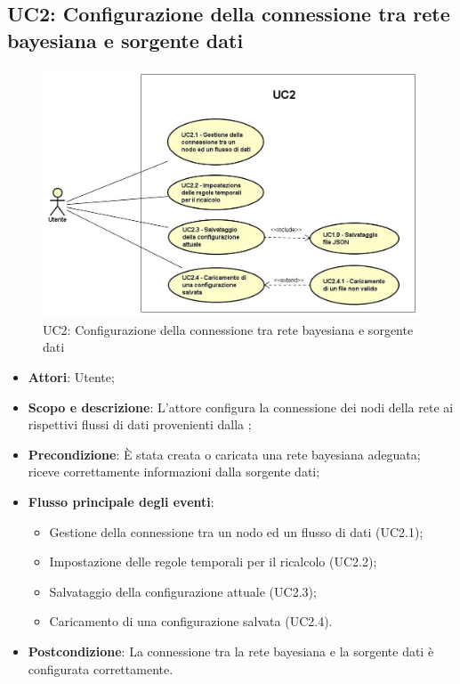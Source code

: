\subsection{UC2: Configurazione della connessione tra rete bayesiana e sorgente dati}
\hypertarget{UC2}{}
\begin{figure} [H]
	\centering
	\includegraphics[scale=0.45]{Img/UC2}
	\caption{UC2: Configurazione della connessione tra rete bayesiana e sorgente dati}\label{}
\end{figure}
\begin{itemize}
	\item \textbf{Attori}: Utente;
	\item \textbf{Scopo e descrizione}: L'attore configura la connessione dei nodi della rete ai rispettivi flussi di dati provenienti dalla ;
	\item \textbf{Precondizione}: È stata creata o caricata una rete bayesiana adeguata;  riceve correttamente informazioni dalla sorgente dati;
	\item \textbf{Flusso principale degli eventi}:
	\begin{itemize}
		\item Gestione della connessione tra un nodo ed un flusso di dati (UC2.1);
		\item Impostazione delle regole temporali per il ricalcolo (UC2.2);
		\item Salvataggio della configurazione attuale (UC2.3);
		\item Caricamento di una configurazione salvata (UC2.4).
	\end{itemize}
	\item \textbf{Postcondizione}: La connessione tra la rete bayesiana e la sorgente dati è configurata correttamente.
\end{itemize}

